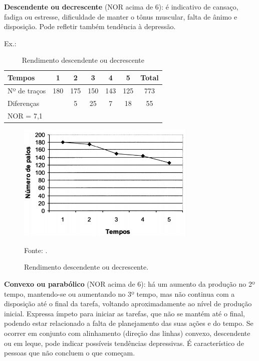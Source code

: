 \textbf{Descendente ou decrescente} (NOR acima de 6): é indicativo de cansaço, fadiga ou estresse, dificuldade de manter o tônus muscular, falta de ânimo e disposição. Pode refletir também tendência à depressão.

Ex.:

\begin{table}[h]
\centering
\caption{Rendimento descendente ou decrescente \cite{psicohood2018} }

\label{tab:decrescente}


\begin{tabular}{|l|c|c|c|c|c|c|}
\hline Tempos       & 1     & 2     & 3    &  4     & 5     & Total \\ 
\hline Nº de traços & 180 & 175 & 150 & 143 & 125 & 773 \\ 
\hline    \multicolumn{2}{|l|}{ Diferenças}& 5   & 25    & 7     & 18    & 55\\ 
\hline NOR = 7,1\\
\cline{1-11}
\end{tabular} 

\end{table}

\begin{figure}[H]
 \centering
 \includegraphics[width=0.76\textwidth]{./fig/grafico-rendimento/decrescente}
 \caption{Rendimento descendente ou decrescente.}
  Fonte: \cite{psicohood2018}.
 \label{fig:ascende}
\end{figure}


\textbf{Convexo ou parabólico} (NOR acima de 6): há um aumento da produção no 2º tempo, mantendo-se ou aumentando no 3º tempo, mas não continua com a disposição até o final da tarefa, voltando aproximadamente ao nível de produção inicial. Expressa ímpeto para iniciar as tarefas, que não se mantém até o final, podendo
estar relacionado a falta de planejamento das suas ações e do tempo. Se ocorrer em conjunto com alinhamento (direção das linhas) convexo, descendente ou em leque, pode indicar possíveis tendências depressivas.
É característico de pessoas que não concluem o que começam.

